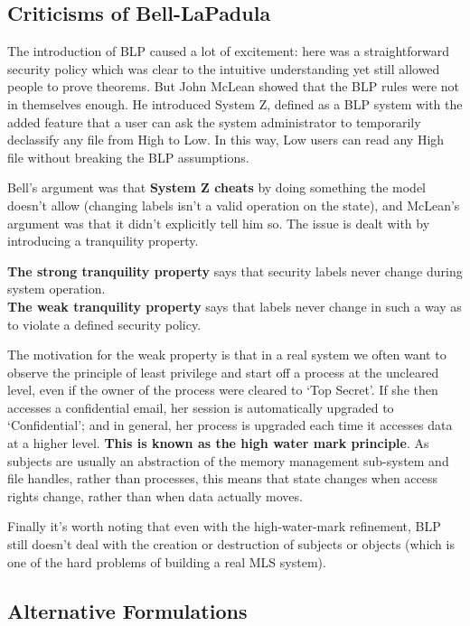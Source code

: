 		\subsection{Criticisms of Bell-LaPadula}
			The introduction of BLP caused a lot of excitement: here was a straightforward
			security policy which was clear to the intuitive understanding yet still allowed
			people to prove theorems. But John McLean showed that the BLP rules
			were not in themselves enough. 
			He introduced System Z, defined as a BLP system with the added feature that a 
			user can ask the system administrator to temporarily declassify any file from 
			High to Low. In this way, Low users can read any High file without breaking the 
			BLP assumptions.
			
			Bell’s argument was that {\bf System Z cheats} by doing something the model
			doesn’t allow (changing labels isn’t a valid operation on the state), and
			McLean’s argument was that it didn’t explicitly tell him so. The issue is dealt
			with by introducing a tranquility property. 

			{\bf The strong tranquility property} says that security labels never change 
			during system operation.\\
			{\bf The weak tranquility property} says that labels never change in such a way 
			as to violate a defined security policy.

			The motivation for the weak property is that in a real system we often
			want to observe the principle of least privilege and start off a process at the
			uncleared level, even if the owner of the process were cleared to ‘Top Secret’.
			If she then accesses a confidential email, her session is automatically upgraded
			to ‘Confidential’; and in general, her process is upgraded each time it accesses
			data at a higher level. {\bf This is known as the high water mark principle}. 
			As subjects are usually an abstraction of the memory management sub-system
			and file handles, rather than processes, this means that state changes when
			access rights change, rather than when data actually moves.

			Finally it’s worth noting that even with the high-water-mark refinement,
			BLP still doesn’t deal with the creation or destruction of subjects or objects
			(which is one of the hard problems of building a real MLS system).

			\clearpage
			\subsection{Alternative Formulations}


